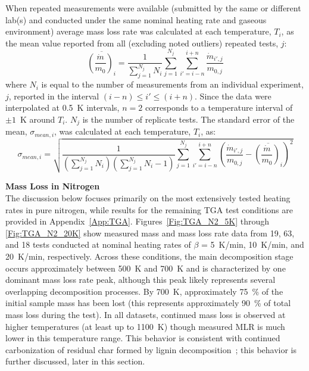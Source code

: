 \documentclass{book}
\begin{document}
When repeated measurements were available (submitted by the same or different lab(s) and conducted under the same nominal heating rate and gaseous environment) average mass loss rate was calculated at each temperature, $T_i$, as the mean value reported from all (excluding noted outliers) repeated tests, $j$:
\begin{equation}
\overline{\left(\frac{\dot{m}}{m_0}\right)_i} = \frac{1}{\sum_{j=1}^{N_j}N_i} \sum_{j=1}^{N_j} \sum_{i'=i-n}^{i+n} \frac{\dot{m}_{i',j}}{m_{0,j}}
\end{equation}
where $N_i$ is equal to the number of measurements from an individual experiment, $j$, reported in the interval $(i-n) \leq i' \leq (i+n)$. Since the data were interpolated at 0.5~K intervals, $n=2$ corresponds to a temperature interval of $\pm1$~K around $T_i$. $N_j$ is the number of replicate tests. The standard error of the mean, $\sigma_{mean,i}$, was calculated at each temperature, $T_i$, as:
\begin{equation}
\sigma_{mean,i} = \sqrt{\frac{1}{\left(\sum_{j=1}^{N_j}N_i\right)\left(\sum_{j=1}^{N_j}N_i-1\right)} \sum_{j=1}^{N_j} \sum_{i'=i-n}^{i+n} \left(\frac{\dot{m}_{i',j}}{m_{0,j}} - \overline{\left(\frac{\dot{m}}{m_0}\right)_i}\right)^2}
\end{equation}

\textbf{Mass Loss in Nitrogen}\\
The discussion below focuses primarily on the most extensively tested heating rates in pure nitrogen, while results for the remaining TGA test conditions are provided in Appendix~\ref{App:TGA}. Figures~\ref{Fig:TGA_N2_5K} through \ref{Fig:TGA_N2_20K} show measured mass and mass loss rate data from 19, 63, and 18 tests conducted at nominal heating rates of $\beta$ = 5~K/min, 10~K/min, and 20~K/min, respectively. Across these conditions, the main decomposition stage occurs approximately between 500~K and 700~K and is characterized by one dominant mass loss rate peak, although this peak likely represents several overlapping decomposition processes. By 700~K, approximately 75~\% of the initial sample mass has been lost (this represents approximately 90~\% of total mass loss during the test). In all datasets, continued mass loss is observed at higher temperatures (at least up to 1100~K) though measured MLR is much lower in this temperature range. This behavior is consistent with continued carbonization of residual char formed by lignin decomposition~\cite{yang2007characteristics,BELLAMY2026100500,MISHRA2015282}; this behavior is further discussed, later in this section.
\end{document}
